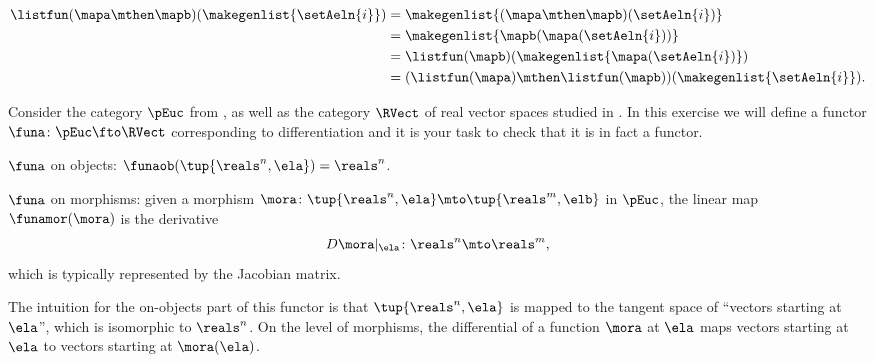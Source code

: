 \begin{example}
    \begin{equation}\label{eq:list-functor-compositionality}
        \begin{aligned}
            \listfun(\mapa \mthen \mapb)(\makegenlist{\setAeln{i}}) & =\makegenlist{ (\mapa \mthen \mapb)(\setAeln{i})} \\
                                                                    & =\makegenlist{  \mapb ( \mapa (\setAeln{i}))} \\
                                                                    & =\listfun(\mapb)(\makegenlist{\mapa(\setAeln{i})}) \\
                                                                    & =(\listfun(\mapa)\mthen \listfun(\mapb))(\makegenlist{\setAeln{i}}).
        \end{aligned}
    \end{equation}
\end{example}

\begin{gradedexercise}
\label{ex:DifferentiationFunctor}
        
Consider the category $\pEuc$ from , as well as the category $\RVect$ of real vector spaces studied in . In this exercise we will define a functor $\funa \colon \pEuc \fto \RVect$ corresponding to differentiation and it is your task to check that it is in fact a functor. 

$\funa$ on objects: $\funaob (\tup{\reals^n, \ela}) = \reals^n$.

$\funa$ on morphisms: given a morphism $\mora \colon \tup{\reals^n, \ela} \mto \tup{\reals^m, \elb}$ in $\pEuc$, the linear map $\funamor(\mora)$ is the derivative
\begin{equation}
D \mora \vert_\ela \colon \reals^n \mto \reals^m,
\end{equation}
which is typically represented by the Jacobian matrix. 
        
The intuition for the on-objects part of this functor is that $\tup{\reals^n, \ela}$ is mapped to the tangent space of ``vectors starting at $\ela$'', which is isomorphic to $\reals^n$. On the level of morphisms, the differential of a function $\mora$ at $\ela$ maps vectors starting at $\ela$ to vectors starting at $\mora(\ela)$. 

\end{gradedexercise}
    
